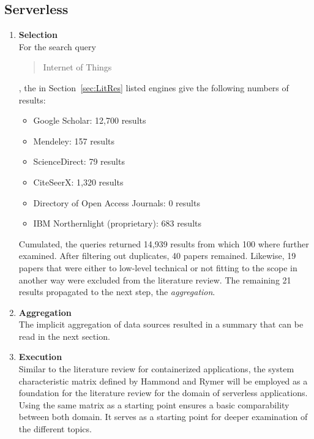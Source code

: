     
    


\subsection{Serverless}\label{sec:serverless}\label{chp:serverless}


\begin{enumerate}
    \item
    \textbf{Selection}\\
    For the search query \blockquote{Internet of Things}, the in Section~\vref{sec:LitRes} listed engines give the following numbers of results:
    
    \begin{itemize}[nolistsep]
        \renewcommand\labelitemi{--}
        \item Google Scholar: 12,700 results
        \item Mendeley: 157 results
        \item ScienceDirect: 79 results
        \item CiteSeerX: 1,320 results
        \item Directory of Open Access Journals: 0 results
        \item IBM Northernlight (proprietary): 683 results
    \end{itemize}
    
    Cumulated, the queries returned 14,939 results from which 100 where further examined. After filtering out duplicates, 40 papers remained. Likewise, 19 papers that were either to low-level technical or not fitting to the scope in another way were excluded from the literature review. The remaining 21 results propagated to the next step, the \textit{aggregation}.
    
    \item
    \textbf{Aggregation}\\
    The implicit aggregation of data sources resulted in a summary that can be read in the next section.
    
    \item
    \textbf{Execution}\\
    
    Similar to the literature review for containerized applications, the system characteristic matrix defined by Hammond and Rymer will be employed as a foundation for the literature review for the domain of serverless applications. Using the same matrix as a starting point ensures a basic comparability between both domain. It serves as a starting point for deeper examination of the different topics. 
    

\end{enumerate}
